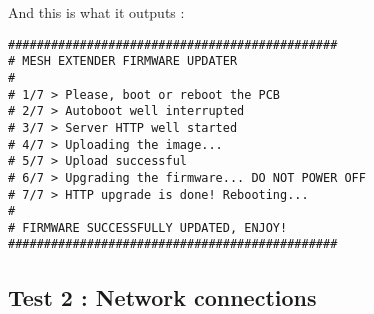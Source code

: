 And this is what it outputs :\\

\begin{lstlisting}
##############################################
# MESH EXTENDER FIRMWARE UPDATER
#
# 1/7 > Please, boot or reboot the PCB
# 2/7 > Autoboot well interrupted
# 3/7 > Server HTTP well started
# 4/7 > Uploading the image...
# 5/7 > Upload successful
# 6/7 > Upgrading the firmware... DO NOT POWER OFF 
# 7/7 > HTTP upgrade is done! Rebooting...
#
# FIRMWARE SUCCESSFULLY UPDATED, ENJOY!
##############################################
\end{lstlisting} 

\subsection{Test 2 : Network connections}


